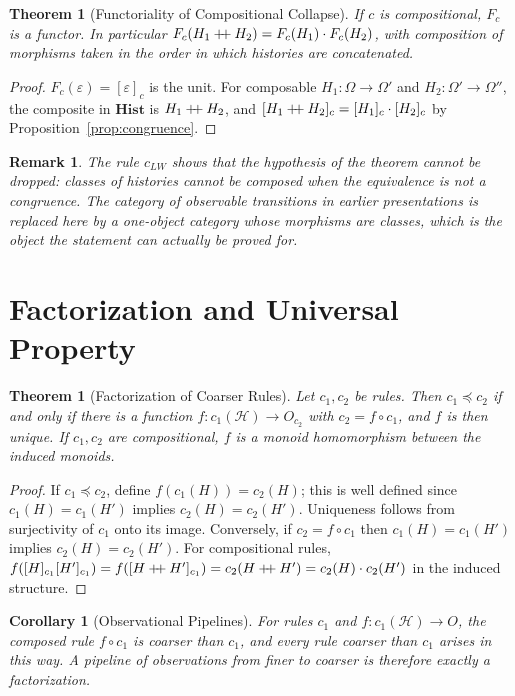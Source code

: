 \documentclass[12pt,oneside,openany]{book}
\theoremstyle{spherepop}
\newtheorem{theorem}[definition]{Theorem}
\newtheorem{corollary}[definition]{Corollary}
\theoremstyle{remarkstyle}
\newtheorem{remark}[definition]{Remark}
\newcommand{\Hist}{\mathbf{Hist}}
\newcommand{\hconcat}{\mathbin{+\mkern-5mu+}}
\newcommand{\calH}{\mathcal{H}}
\begin{document}
\begin{theorem}[Functoriality of Compositional Collapse]
\label{thm:functor}
If $c$ is compositional, $F_c$ is a functor. In particular $F_c(H_1\hconcat H_2)=F_c(H_1)\cdot F_c(H_2)$, with composition of morphisms taken in the order in which histories are concatenated.
\end{theorem}

\begin{proof}
$F_c(\varepsilon)=[\varepsilon]_c$ is the unit. For composable $H_1:\Omega\to\Omega'$ and $H_2:\Omega'\to\Omega''$, the composite in $\Hist$ is $H_1\hconcat H_2$, and $[H_1\hconcat H_2]_c=[H_1]_c\cdot[H_2]_c$ by Proposition~\ref{prop:congruence}.
\end{proof}

\begin{remark}
The rule $c_{LW}$ shows that the hypothesis of the theorem cannot be dropped: classes of histories cannot be composed when the equivalence is not a congruence. The category of observable transitions in earlier presentations is replaced here by a one-object category whose morphisms are classes, which is the object the statement can actually be proved for.
\end{remark}

\section{Factorization and Universal Property}

\begin{theorem}[Factorization of Coarser Rules]
\label{thm:factorization}
Let $c_1,c_2$ be rules. Then $c_1\preceq c_2$ if and only if there is a function $f:c_1(\calH)\to O_{c_2}$ with $c_2=f\circ c_1$, and $f$ is then unique. If $c_1,c_2$ are compositional, $f$ is a monoid homomorphism between the induced monoids.
\end{theorem}

\begin{proof}
If $c_1\preceq c_2$, define $f(c_1(H))=c_2(H)$; this is well defined since $c_1(H)=c_1(H')$ implies $c_2(H)=c_2(H')$. Uniqueness follows from surjectivity of $c_1$ onto its image. Conversely, if $c_2=f\circ c_1$ then $c_1(H)=c_1(H')$ implies $c_2(H)=c_2(H')$. For compositional rules, $f([H]_{c_1}[H']_{c_1})=f([H\hconcat H']_{c_1})=c_2(H\hconcat H')=c_2(H)\cdot c_2(H')$ in the induced structure.
\end{proof}

\begin{corollary}[Observational Pipelines]
For rules $c_1$ and $f:c_1(\calH)\to O$, the composed rule $f\circ c_1$ is coarser than $c_1$, and every rule coarser than $c_1$ arises in this way. A pipeline of observations from finer to coarser is therefore exactly a factorization.
\end{corollary}
\end{document}
